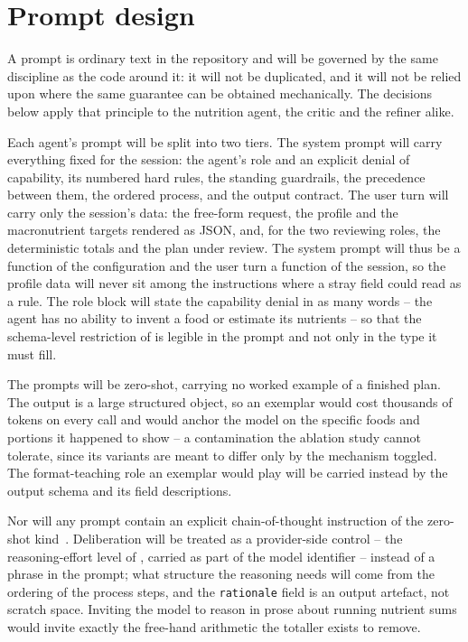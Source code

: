 \section{Prompt design}
\label{sec:design-prompts}

A prompt is ordinary text in the repository and will be governed by the same discipline as the code around it: it will not be duplicated, and it will not be relied upon where the same guarantee can be obtained mechanically. The decisions below apply that principle to the nutrition agent, the critic and the refiner alike.

Each agent's prompt will be split into two tiers. The system prompt will carry everything fixed for the session: the agent's role and an explicit denial of capability, its numbered hard rules, the standing guardrails, the precedence between them, the ordered process, and the output contract. The user turn will carry only the session's data: the free-form request, the profile and the macronutrient targets rendered as JSON, and, for the two reviewing roles, the deterministic totals and the plan under review. The system prompt will thus be a function of the configuration and the user turn a function of the session, so the profile data will never sit among the instructions where a stray field could read as a rule. The role block will state the capability denial in as many words -- the agent has no ability to invent a food or estimate its nutrients -- so that the schema-level restriction of  is legible in the prompt and not only in the type it must fill.

The prompts will be zero-shot, carrying no worked example of a finished plan. The output is a large structured object, so an exemplar would cost thousands of tokens on every call and would anchor the model on the specific foods and portions it happened to show -- a contamination the ablation study cannot tolerate, since its variants are meant to differ only by the mechanism toggled. The format-teaching role an exemplar would play will be carried instead by the output schema and its field descriptions.

Nor will any prompt contain an explicit chain-of-thought instruction of the zero-shot kind~\cite{kojima2022large}. Deliberation will be treated as a provider-side control -- the reasoning-effort level of , carried as part of the model identifier -- instead of a phrase in the prompt; what structure the reasoning needs will come from the ordering of the process steps, and the \texttt{rationale} field is an output artefact, not scratch space. Inviting the model to reason in prose about running nutrient sums would invite exactly the free-hand arithmetic the totaller exists to remove.

